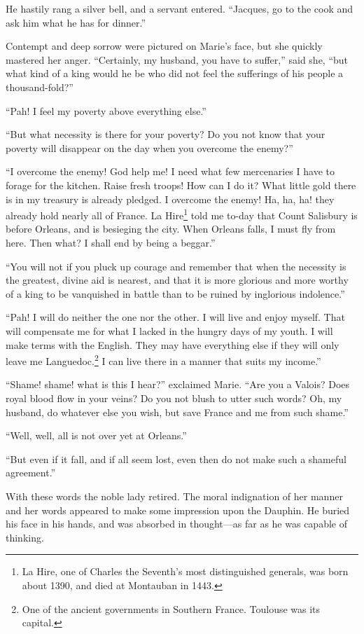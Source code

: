 He hastily rang a silver bell, and a servant entered. ``Jacques, go to
the cook and ask him what he has for dinner.''

Contempt and deep sorrow were pictured on Marie's face, but she quickly
mastered her anger. ``Certainly, my husband, you have to suffer,'' said
she, ``but what kind of a king would he be who did not feel the
sufferings of his people a thousand-fold?''

``Pah! I feel my poverty above everything else.''

``But what necessity is there for your poverty? Do you not know that
your poverty will disappear on the day when you overcome the enemy?''

``I overcome the enemy! God help me! I need what few mercenaries I have
to forage for the kitchen. Raise fresh troops! How can I do it? What
little gold there is in my treasury is already pledged. I overcome the
enemy! Ha, ha, ha! they already hold nearly all of France. La
Hire\footnote{La Hire, one of Charles the Seventh's most distinguished
  generals, was born about 1390, and died at Montauban in 1443.} told me
to-day that Count Salisbury is before Orleans, and is besieging the
city. When Orleans falls, I must fly from here. Then what? I shall end
by being a beggar.''

``You will not if you pluck up courage and remember that when the
necessity is the greatest, divine aid is nearest, and that it is more
glorious and more worthy of a king to be vanquished in battle than to be
ruined by inglorious indolence.''

``Pah! I will do neither the one nor the other. I will live and enjoy
myself. That will compensate me for what I lacked in the hungry days of
my youth. I will make terms with the English. They may have everything
else if they will only leave me Languedoc.\footnote{One of the ancient
  governments in Southern France. Toulouse was its capital.} I can live
there in a manner that suits my income.''

``Shame! shame! what is this I hear?'' exclaimed Marie. ``Are you a
Valois? Does royal blood flow in your veins? Do you not blush to utter
such words? Oh, my husband, do whatever else you wish, but save France
and me from such shame.''

``Well, well, all is not over yet at Orleans.''

``But even if it fall, and if all seem lost, even then do not make such
a shameful agreement.''

With these words the noble lady retired. The moral indignation of her
manner and her words appeared to make some impression upon the Dauphin.
He buried his face in his hands, and was absorbed in thought---as far as
he was capable of thinking.

